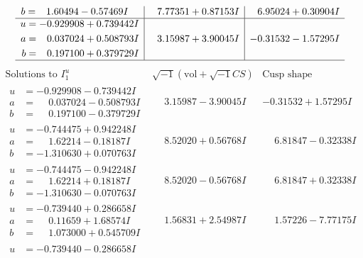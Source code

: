 \documentclass[1p]{elsarticle_modified}
\theoremstyle{definition}
\newcommand{\I}{\sqrt{-1}}
\begin{document}
$$\begin{array}{c|c|c}
\begin{aligned}
b &= \phantom{-}1.60494 - 0.57469 I\end{aligned}
 & \phantom{-}7.77351 + 0.87153 I & \phantom{-}6.95024 + 0.30904 I \\ \hline\begin{aligned}
u &= -0.929908 + 0.739442 I \\
a &= \phantom{-}0.037024 + 0.508793 I \\
b &= \phantom{-}0.197100 + 0.379729 I\end{aligned}
 & \phantom{-}3.15987 + 3.90045 I & -0.31532 - 1.57295 I\\
 \hline 
 \end{array}$$\newpage$$\begin{array}{c|c|c}  
\text{Solutions to }I^u_{1}& \I (\text{vol} + \sqrt{-1}CS) & \text{Cusp shape}\\
 \hline 
\begin{aligned}
u &= -0.929908 - 0.739442 I \\
a &= \phantom{-}0.037024 - 0.508793 I \\
b &= \phantom{-}0.197100 - 0.379729 I\end{aligned}
 & \phantom{-}3.15987 - 3.90045 I & -0.31532 + 1.57295 I \\ \hline\begin{aligned}
u &= -0.744475 + 0.942248 I \\
a &= \phantom{-}1.62214 - 0.18187 I \\
b &= -1.310630 + 0.070763 I\end{aligned}
 & \phantom{-}8.52020 + 0.56768 I & \phantom{-}6.81847 - 0.32338 I \\ \hline\begin{aligned}
u &= -0.744475 - 0.942248 I \\
a &= \phantom{-}1.62214 + 0.18187 I \\
b &= -1.310630 - 0.070763 I\end{aligned}
 & \phantom{-}8.52020 - 0.56768 I & \phantom{-}6.81847 + 0.32338 I \\ \hline\begin{aligned}
u &= -0.739440 + 0.286658 I \\
a &= \phantom{-}0.11659 + 1.68574 I \\
b &= \phantom{-}1.073000 + 0.545709 I\end{aligned}
 & \phantom{-}1.56831 + 2.54987 I & \phantom{-}1.57226 - 7.77175 I \\ \hline\begin{aligned}
u &= -0.739440 - 0.286658 I \\

\end{aligned}
\end{array}$$
\end{document}

